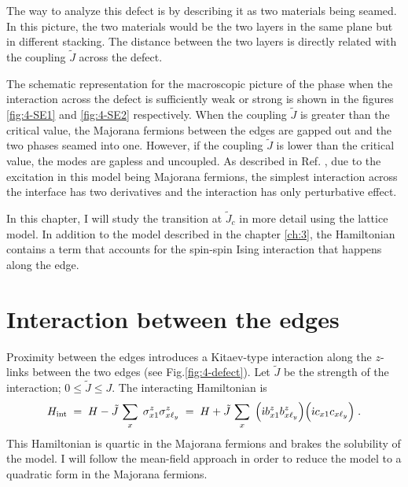 

The way to analyze this defect is by describing it as two materials being seamed. In this picture,  the two materials would be the two layers in the same plane but in different stacking. The distance between the two layers is directly related with the coupling $\tilde{J}$ across the defect. 

The schematic representation for the macroscopic picture of the phase when the interaction across the defect is sufficiently weak or strong is shown in the figures \ref{fig:4-SE1} and \ref{fig:4-SE2} respectively. When the coupling  $\tilde{J}$ is greater than the critical value, the Majorana fermions between the edges are gapped out and the two phases seamed into one. However, if the coupling $\tilde{J}$ is lower than the critical value, the modes are gapless and uncoupled. As described in Ref. \cite{Aasen_2020}, due to the excitation in this model being Majorana fermions, the simplest interaction across the interface has two derivatives and the interaction has only perturbative effect. 

In this chapter, I will study the transition at $\tilde{J}_c$ in more detail using the lattice model. In addition to the model described in the chapter \ref{ch:3}, the Hamiltonian contains a term that accounts for the spin-spin Ising interaction that happens along the edge.


\section{Interaction between the edges}

Proximity between the edges introduces a Kitaev-type interaction along the $z$-links between the two edges (see Fig.\ref{fig:4-defect}). Let $\tilde{J}$ be the strength of the interaction; $0 \leq \tilde{J} \leq J$. The interacting Hamiltonian is
\begin{equation}
    H_{\text{int}} \; = \; H - \tilde{J} \, \sum_{x} \; \sigma^{z}_{x1} \sigma_{x\ell_y}^{z} \; = \; H+ \tilde{J} \, \sum_{x} \; \Big( \dot{\imath} b^{z}_{x1}b_{x\ell_y}^{z} \Big)\Big( \dot{\imath} c_{x1}c_{x\ell_y} \Big)\;.
\end{equation}
This Hamiltonian is quartic in the Majorana fermions and brakes the solubility of the model. I will follow the mean-field approach in order to reduce the model to a quadratic form in the Majorana fermions. %

